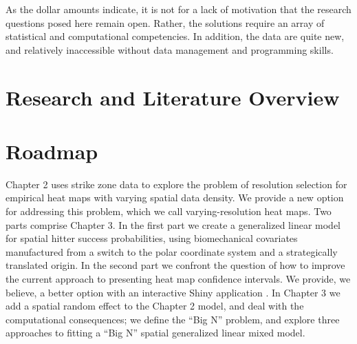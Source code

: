 As the dollar amounts indicate, it is not for a lack of motivation that the research questions posed here remain open. Rather, the solutions require an array of statistical and computational competencies. In addition, the data are quite new, and relatively inaccessible without data management and programming skills.


\section{Research and Literature Overview}

\section{Roadmap}


Chapter 2 uses strike zone data to explore the problem of resolution selection for empirical heat maps with varying spatial data density. We provide a new option for addressing this problem, which we call varying-resolution heat maps. Two parts comprise Chapter 3. In the first part we create a generalized linear model for spatial hitter success probabilities, using biomechanical covariates manufactured from a switch to the polar coordinate system and a strategically translated origin. In the second part we confront the question of how to improve the current approach to presenting heat map confidence intervals. We provide, we believe, a better option with an interactive Shiny application \citep{Shiny}. In Chapter 3 we add a spatial random effect to the Chapter 2 model, and deal with the computational consequences; we define the ``Big N'' problem, and explore three approaches to fitting a ``Big N'' spatial generalized linear mixed model. 

% 
% 
% 
% 